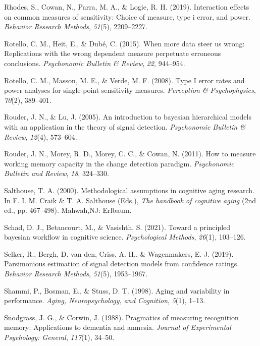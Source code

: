 \documentclass[
  english,
  ,man,floatsintext]{apa6}
\begin{document}
\leavevmode\hypertarget{ref-rhodes2019interaction}{}%
Rhodes, S., Cowan, N., Parra, M. A., \& Logie, R. H. (2019). Interaction effects on common measures of sensitivity: Choice of measure, type i error, and power. \emph{Behavior Research Methods}, \emph{51}(5), 2209--2227.

\leavevmode\hypertarget{ref-RotelloEtAl2015}{}%
Rotello, C. M., Heit, E., \& Dubé, C. (2015). When more data steer us wrong: Replications with the wrong dependent measure perpetuate erroneous conclusions. \emph{Psychonomic Bulletin \& Review}, \emph{22}, 944--954.

\leavevmode\hypertarget{ref-RotelloEtAl2008}{}%
Rotello, C. M., Masson, M. E., \& Verde, M. F. (2008). Type I error rates and power analyses for single-point sensitivity measures. \emph{Perception \& Psychophysics}, \emph{70}(2), 389--401.

\leavevmode\hypertarget{ref-rouder2005introduction}{}%
Rouder, J. N., \& Lu, J. (2005). An introduction to bayesian hierarchical models with an application in the theory of signal detection. \emph{Psychonomic Bulletin \& Review}, \emph{12}(4), 573--604.

\leavevmode\hypertarget{ref-RouderEtAl2011}{}%
Rouder, J. N., Morey, R. D., Morey, C. C., \& Cowan, N. (2011). How to measure working memory capacity in the change detection paradigm. \emph{Psychonomic Bulletin and Review}, \emph{18}, 324--330.

\leavevmode\hypertarget{ref-Salthouse2000}{}%
Salthouse, T. A. (2000). Methodological assumptions in cognitive aging research. In F. I. M. Craik \& T. A. Salthouse (Eds.), \emph{The handbook of cognitive aging} (2nd ed., pp. 467--498). Mahwah,NJ: Erlbaum.

\leavevmode\hypertarget{ref-schad2021toward}{}%
Schad, D. J., Betancourt, M., \& Vasishth, S. (2021). Toward a principled bayesian workflow in cognitive science. \emph{Psychological Methods}, \emph{26}(1), 103--126.

\leavevmode\hypertarget{ref-selker2019parsimonious}{}%
Selker, R., Bergh, D. van den, Criss, A. H., \& Wagenmakers, E.-J. (2019). Parsimonious estimation of signal detection models from confidence ratings. \emph{Behavior Research Methods}, \emph{51}(5), 1953--1967.

\leavevmode\hypertarget{ref-shammi1998aging}{}%
Shammi, P., Bosman, E., \& Stuss, D. T. (1998). Aging and variability in performance. \emph{Aging, Neuropsychology, and Cognition}, \emph{5}(1), 1--13.

\leavevmode\hypertarget{ref-SnodgrassAndCorwin1988}{}%
Snodgrass, J. G., \& Corwin, J. (1988). Pragmatics of measuring recognition memory: Applications to dementia and amnesia. \emph{Journal of Experimental Psychology: General}, \emph{117}(1), 34--50.
\end{document}
